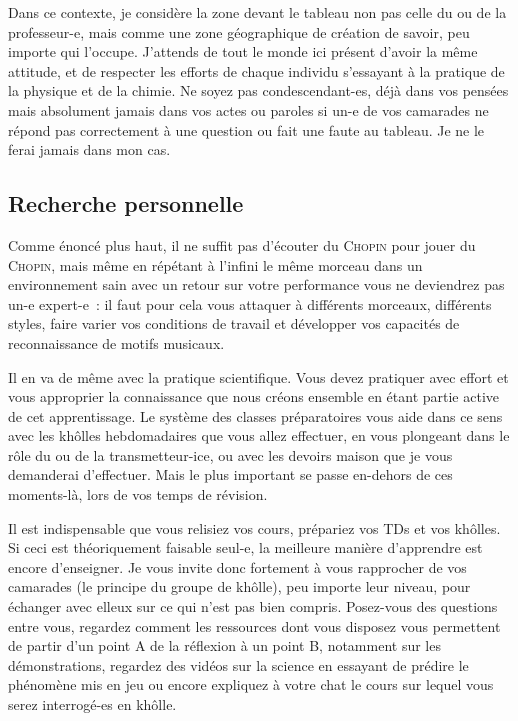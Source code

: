 \documentclass[a4paper, 10pt, final, garamond]{book}
\begin{document}
Dans ce contexte, je considère la zone devant le tableau non pas celle du ou de
la professeur-e, mais comme une zone géographique de création de savoir, peu
importe qui l'occupe. J'attends de tout le monde ici présent d'avoir la même
attitude, et de respecter les efforts de chaque individu s'essayant à la
pratique de la physique et de la chimie. Ne soyez pas condescendant-es, déjà
dans vos pensées mais absolument jamais dans vos actes ou paroles si un-e de vos
camarades ne répond pas correctement à une question ou fait une faute au
tableau. Je ne le ferai jamais dans mon cas.

\subsection{Recherche personnelle}

Comme énoncé plus haut, il ne suffit pas d'écouter du \textsc{Chopin} pour jouer
du \textsc{Chopin}, mais même en répétant à l'infini le même morceau dans un
environnement sain avec un retour sur votre performance vous ne deviendrez pas
un-e expert-e~: il faut pour cela vous attaquer à différents morceaux,
différents styles, faire varier vos conditions de travail et développer vos
capacités de reconnaissance de motifs musicaux.

Il en va de même avec la pratique scientifique. Vous devez pratiquer avec effort
et vous approprier la connaissance que nous créons ensemble en étant partie
active de cet apprentissage. Le système des classes préparatoires vous aide dans
ce sens avec les khôlles hebdomadaires que vous allez effectuer, en vous
plongeant dans le rôle du ou de la transmetteur-ice, ou avec les devoirs maison
que je vous demanderai d'effectuer. Mais le plus important se passe en-dehors de
ces moments-là, lors de vos temps de révision.

Il est indispensable que vous relisiez vos cours, prépariez vos TDs et vos
khôlles. Si ceci est théoriquement faisable seul-e, la meilleure manière
d'apprendre est encore d'enseigner. Je vous invite donc fortement à vous
rapprocher de vos camarades (le principe du groupe de khôlle), peu importe leur
niveau, pour échanger avec elleux sur ce qui n'est pas bien compris. Posez-vous
des questions entre vous, regardez comment les ressources dont vous disposez
vous permettent de partir d'un point A de la réflexion à un point B, notamment
sur les démonstrations, regardez des vidéos sur la science en essayant de
prédire le phénomène mis en jeu ou encore expliquez à votre chat le cours sur
lequel vous serez interrogé-es en khôlle.
\end{document}
